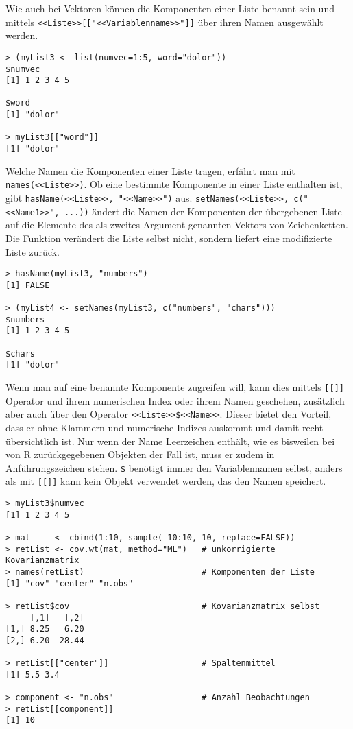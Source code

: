 Wie auch bei Vektoren können die Komponenten einer Liste benannt sein und mittels \lstinline!<<Liste>>[["<<Variablenname>>"]]! über ihren Namen ausgewählt werden.
\begin{lstlisting}
> (myList3 <- list(numvec=1:5, word="dolor"))
$numvec
[1] 1 2 3 4 5

$word
[1] "dolor"

> myList3[["word"]]
[1] "dolor"
\end{lstlisting}

Welche Namen die Komponenten einer Liste tragen, erfährt man mit \lstinline!names(<<Liste>>)!. Ob eine bestimmte Komponente in einer Liste enthalten ist, gibt \lstinline!hasName(<<Liste>>, "<<Name>>")! aus. \lstinline!setNames(<<Liste>>, c("<<Name1>>", ...))! ändert die Namen der Komponenten der übergebenen Liste auf die Elemente des als zweites Argument genannten Vektors von Zeichenketten. Die Funktion verändert die Liste selbst nicht, sondern liefert eine modifizierte Liste zurück.
\begin{lstlisting}
> hasName(myList3, "numbers")
[1] FALSE

> (myList4 <- setNames(myList3, c("numbers", "chars")))
$numbers
[1] 1 2 3 4 5

$chars
[1] "dolor"
\end{lstlisting}

Wenn man auf eine benannte Komponente zugreifen will, kann dies mittels \lstinline![[]]! Operator und ihrem numerischen Index oder ihrem Namen geschehen, zusätzlich aber auch über den Operator \lstinline!<<Liste>>$<<Name>>!. Dieser bietet den Vorteil, dass er ohne Klammern und numerische Indizes auskommt und damit recht übersichtlich ist. Nur wenn der Name Leerzeichen enthält, wie es bisweilen bei von R zurückgegebenen Objekten der Fall ist, muss er zudem in Anführungszeichen stehen. \lstinline!$! benötigt immer den Variablennamen selbst, anders als mit \lstinline![[]]! kann kein Objekt verwendet werden, das den Namen speichert.
\begin{lstlisting}
> myList3$numvec
[1] 1 2 3 4 5

> mat     <- cbind(1:10, sample(-10:10, 10, replace=FALSE))
> retList <- cov.wt(mat, method="ML")   # unkorrigierte Kovarianzmatrix
> names(retList)                        # Komponenten der Liste
[1] "cov" "center" "n.obs"

> retList$cov                           # Kovarianzmatrix selbst
     [,1]   [,2]
[1,] 8.25   6.20
[2,] 6.20  28.44

> retList[["center"]]                   # Spaltenmittel
[1] 5.5 3.4

> component <- "n.obs"                  # Anzahl Beobachtungen
> retList[[component]]
[1] 10
\end{lstlisting}

